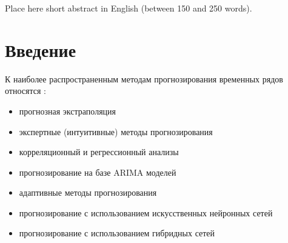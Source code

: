 \documentclass[60x84/16,8pt]{ittmm}
\begin{document}






\begin{altabstract}
Place here short abstract in English (between 150 and 250 words).
\end{altabstract}


\maketitle

\section{Введение}
\label{sec:intro}
К наиболее распространенным методам прогнозирования временных рядов относятся \cite{Tihonov2006}:
\begin{itemize}
    \item прогнозная экстраполяция
    \item экспертные (интуитивные) методы прогнозирования
    \item корреляционный и регрессионный анализы
    \item прогнозирование на базе ARIMA моделей
    \item адаптивные методы прогнозирования
    \item прогнозирование с использованием искусственных нейронных сетей
    \item прогнозирование с использованием гибридных сетей
\end{itemize}
\end{document}
